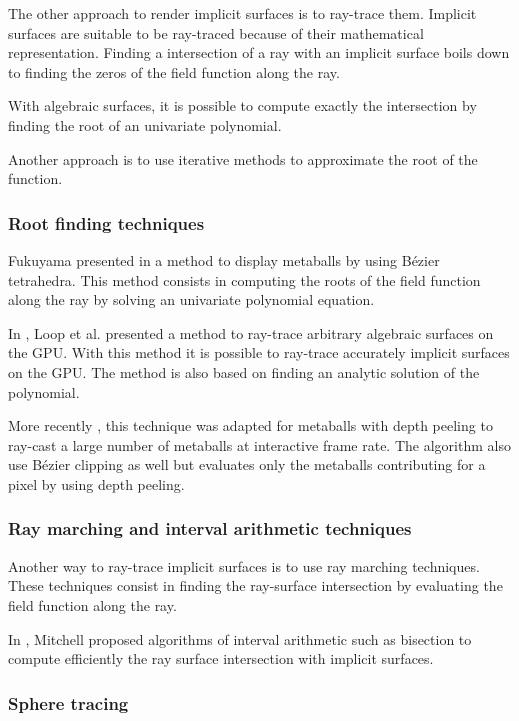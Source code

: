 \documentclass[annual]{acmsiggraph}
\begin{document}
The other approach to render implicit surfaces is to ray-trace them.
Implicit surfaces are suitable to be ray-traced because of their mathematical representation.
Finding a intersection of a ray with an implicit surface boils down to finding the zeros of the field function along the ray.

With algebraic surfaces, it is possible to compute exactly the intersection by finding the root of an univariate polynomial.

Another approach is to use iterative methods to approximate the root of the function.

\subsubsection{Root finding techniques}

Fukuyama presented in \cite{Fukuyama94amethod} a method to display metaballs by using B\'{e}zier tetrahedra. This method consists in computing the roots of the field function along the ray by solving an univariate polynomial equation.

In \cite{Loop:2006:RGR:1179352.1141939}, Loop et al. presented a method to ray-trace arbitrary algebraic surfaces on the GPU.
With this method it is possible to ray-trace accurately implicit surfaces on the GPU. The method is also based on finding an analytic solution of the polynomial.

 
More recently \cite{Kanamori:2008}, this technique was adapted for metaballs with depth peeling to ray-cast a large number of metaballs at interactive frame rate. The algorithm also use B\'{e}zier clipping as well but evaluates only the metaballs contributing for a pixel by using depth peeling.


\subsubsection{Ray marching and interval arithmetic techniques}

Another way to ray-trace implicit surfaces is to use ray marching techniques.
These techniques consist in finding the ray-surface intersection by evaluating the field function along the ray.

In \cite{Mitchell:1990:RRI:93267.93276}, Mitchell proposed algorithms of interval arithmetic such as bisection to compute efficiently the ray surface intersection with implicit surfaces.   

\subsubsection{Sphere tracing}
\end{document}

